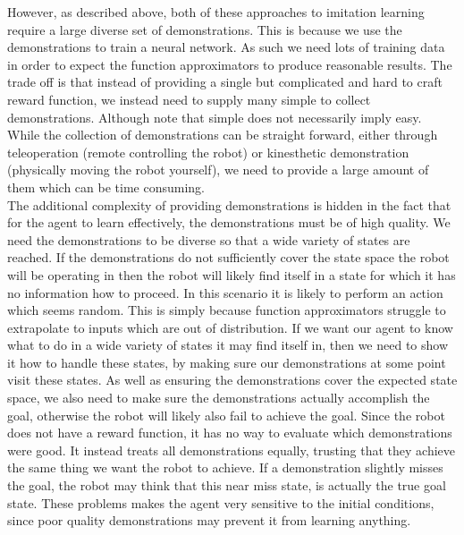 However, as described above, both of these approaches to imitation learning require a large diverse set of demonstrations. This is because we use the demonstrations to train a neural network. As such we need lots of training data in order to expect the function approximators to produce reasonable results. The trade off is that instead of providing a single but complicated and hard to craft reward function, we instead need to supply many simple to collect demonstrations. Although note that simple does not necessarily imply easy. While the collection of demonstrations can be straight forward, either through teleoperation (remote controlling the robot) or kinesthetic demonstration (physically moving the robot yourself), we need to provide a large amount of them which can be time consuming.\\
The additional complexity of providing demonstrations is hidden in the fact that for the agent to learn effectively, the demonstrations must be of high quality. We need the demonstrations to be diverse so that a wide variety of states are reached. If the demonstrations do not sufficiently cover the state space the robot will be operating in then the robot will likely find itself in a state for which it has no information how to proceed. In this scenario it is likely to perform an action which seems random. This is simply because function approximators struggle to extrapolate to inputs which are out of distribution. If we want our agent to know what to do in a wide variety of states it may find itself in, then we need to show it how to handle these states, by making sure our demonstrations at some point visit these states. As well as ensuring the demonstrations cover the expected state space, we also need to make sure the demonstrations actually accomplish the goal, otherwise the robot will likely also fail to achieve the goal. Since the robot does not have a reward function, it has no way to evaluate which demonstrations were good. It instead treats all demonstrations equally, trusting that they achieve the same thing we want the robot to achieve. If a demonstration slightly misses the goal, the robot may think that this near miss state, is actually the true goal state. These problems makes the agent very sensitive to the initial conditions, since poor quality demonstrations may prevent it from learning anything.\\


